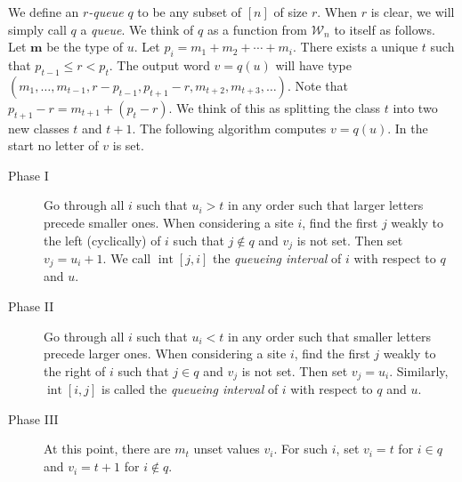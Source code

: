 \documentclass[reqno]{amsart}
\newcommand{\0}{\phantom{c}}
\DeclareMathOperator{\inter}{int} %
\newcommand{\mm}{\mathbf{m}}
\newcommand{\mcW}{\mathcal{W}}
\newcommand{\defn}[1]{{\color{darkred}\emph{#1}}} %
\theoremstyle{plain}
\theoremstyle{definition}
\numberwithin{equation}{section}
\begin{document}
We define an \defn{$r$-queue} $q$ to be any subset of $[n]$ of size $r$. When $r$ is clear, we will simply call $q$ a \defn{queue}.
We think of $q$ as a function from $\mcW_n$ to itself as follows.
Let $\mm$ be the type of $u$.
Let $p_i = m_1 + m_2 + \cdots + m_i$.
There exists a unique $t$ such that
$
p_{t-1} \leq r < p_t.
$
The output word $v = q(u)$ will have type $(m_1, \dots, m_{t-1}, r-p_{t-1}, p_{t+1}-r, m_{t+2}, m_{t+3}, \ldots)$.
Note that $p_{t+1} - r = m_{t+1} + (p_t - r)$.
We think of this as splitting the class $t$ into two new classes $t$ and $t+1$. The following algorithm computes $v = q(u)$. In the start no letter of $v$ is set.

\begin{description}
\item[Phase I]
  Go through all $i$ such that $u_i > t$ in any order such that larger letters precede smaller ones.
  When considering a site $i$, find the first $j$ weakly to the left (cyclically) of $i$ such that $j \notin q$ and $v_j$ is not set. Then set $v_j = u_i + 1$. We call $\inter[j,i]$ the \defn{queueing interval} of $i$ with respect to $q$ and $u$.

\item[Phase II]
  Go through all $i$ such that $u_i < t$ in any order such that smaller letters precede larger ones.
  When considering a site $i$, find the first $j$ weakly to the right of $i$ such that $j \in q$ and $v_j$ is not set. Then set $v_j = u_i$. Similarly, $\inter[i,j]$ is called the \defn{queueing interval} of $i$ with respect to $q$ and $u$.

\item[Phase III]
  At this point, there are $m_t$ unset values $v_i$. For such $i$, set $v_i = t$ for $i \in q$ and $v_i = t+1$ for $i\notin q$.
\end{description}
\end{document}
